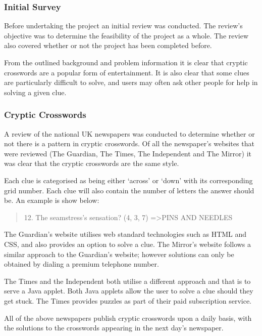 \subsubsection{Initial Survey}

Before undertaking the project an initial review was conducted. The review's 
objective was to determine the feasibility of the project as a whole. The 
review also covered whether or not the project has been completed before.

From the outlined background and problem information it is clear that cryptic 
crosswords are a popular form of entertainment. It is also clear that some 
clues are particularly difficult to solve, and users may often ask other people
for help in solving a given clue.


\subsubsection{Cryptic Crosswords}

A review of the national UK newspapers was conducted to determine whether or 
not there is a pattern in cryptic crosswords. Of all the newspaper's websites 
that were reviewed (The Guardian, The Times, The Independent and The Mirror) it 
was clear that the cryptic crosswords are the same style.

Each clue is categorised as being either `across' or `down' with its 
corresponding grid number. Each clue will also contain the number of letters 
the answer should be. An example is show below:

\begin{quote}
12. The seamstress's sensation? (4, 3, 7) =\textgreater  PINS AND NEEDLES
\end{quote}

The Guardian's website utilises web standard technologies such as HTML and CSS, 
and also provides an option to solve a clue. The Mirror's website follows a 
similar approach to the Guardian’s website; however solutions can only be 
obtained by dialing a premium telephone number.

The Times and the Independent both utilise a different approach and that is to 
serve a Java applet. Both Java applets allow the user to solve a clue should 
they get stuck. The Times provides puzzles as part of their paid subscription 
service.

All of the above newspapers publish cryptic crosswords upon a daily basis, with
the solutions to the crosswords appearing in the next day's newspaper.

